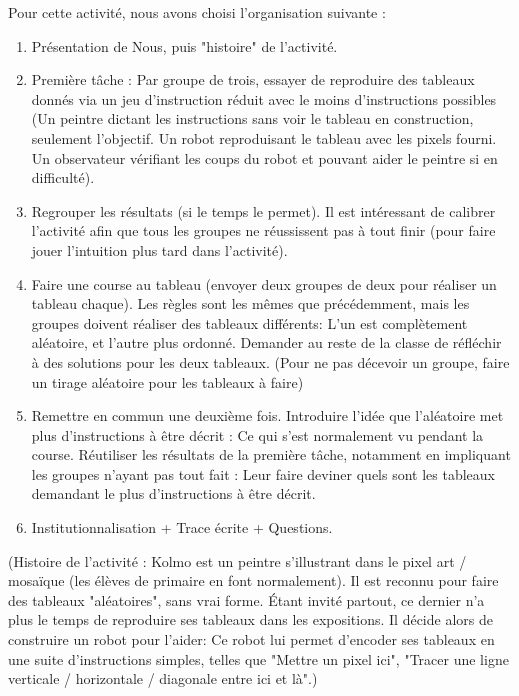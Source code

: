 \documentclass{article}
\begin{document}
Pour cette activité, nous avons choisi l'organisation suivante : 
\begin{enumerate}
\item Présentation de Nous, puis "histoire" de l'activité.
\item Première tâche : Par groupe de trois, essayer de reproduire des tableaux donnés via un jeu d'instruction réduit avec le moins d'instructions possibles (Un peintre dictant les instructions sans voir le tableau en construction, seulement l'objectif. Un robot reproduisant le tableau avec les pixels fourni. Un observateur vérifiant les coups du robot et pouvant aider le peintre si en difficulté).

\item Regrouper les résultats (si le temps le permet). Il est intéressant de calibrer l'activité afin que tous les groupes ne réussissent pas à tout finir (pour faire jouer l'intuition plus tard dans l'activité).

\item Faire une course au tableau (envoyer deux groupes de deux pour réaliser un tableau chaque). Les règles sont les mêmes que précédemment, mais les groupes doivent réaliser des tableaux différents: L'un est complètement aléatoire, et l'autre plus ordonné. Demander au reste de la classe de réfléchir à des solutions pour les deux tableaux. (Pour ne pas décevoir un groupe, faire un tirage aléatoire pour les tableaux à faire)

\item Remettre en commun une deuxième fois. Introduire l'idée que l'aléatoire met plus d'instructions à être décrit : Ce qui s'est normalement vu pendant la course. Réutiliser les résultats de la première tâche, notamment en impliquant les groupes n'ayant pas tout fait : Leur faire deviner quels sont les tableaux demandant le plus d'instructions à être décrit.

\item Institutionnalisation + Trace écrite + Questions. 
\end{enumerate}

\bigskip

(Histoire de l'activité : Kolmo est un peintre s'illustrant dans le pixel art / mosaïque (les élèves de primaire en font normalement). Il est reconnu pour faire des tableaux "aléatoires", sans vrai forme. Étant invité partout, ce dernier n'a plus le temps de reproduire ses tableaux dans les expositions. Il décide alors de construire un robot pour l'aider: Ce robot lui permet d'encoder ses tableaux en une suite d'instructions simples, telles que "Mettre un pixel ici", "Tracer une ligne verticale / horizontale / diagonale entre ici et là".)
\end{document}
